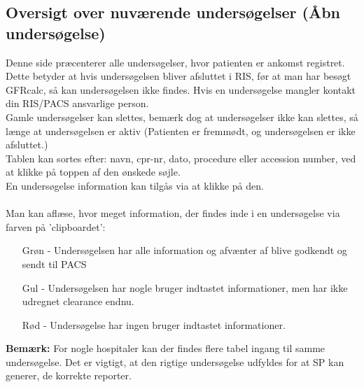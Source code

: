 \documentclass{article}
\begin{document}
\subsection{Oversigt over nuværende undersøgelser (Åbn undersøgelse)}
Denne side præcenterer alle undersøgelser, hvor patienten er ankomst registret. Dette betyder at hvis undersøgelsen bliver afsluttet i RIS, før at man har besøgt GFRcalc, så kan undersøgelsen ikke findes. Hvis en undersøgelse mangler kontakt din RIS/PACS ansvarlige person.\\
Gamle undersøgelser kan slettes, bemærk dog at undersøgelser ikke kan slettes, så længe at undersøgelsen er aktiv (Patienten er fremmødt, og undersøgelsen er ikke afsluttet.)\\
Tablen kan sortes efter: navn, cpr-nr, dato, procedure eller accession number, ved at klikke på toppen af den ønskede søjle.\\
En undersøgelse information kan tilgås via at klikke på den.\\\\
Man kan aflæse, hvor meget information, der findes inde i en undersøgelse via farven på 'clipboardet':
\begin{itemize}
	\item[Grøn] - Undersøgelsen har alle information og afvænter af blive godkendt og sendt til PACS
	\item[Gul] - Undersøgelsen har nogle bruger indtastet informationer, men har ikke udregnet clearance endnu. 
	\item[Rød] - Undersøgelse har ingen bruger indtastet informationer. 
\end{itemize} 
\textbf{Bemærk:} For nogle hospitaler kan der findes flere tabel ingang til samme undersøgelse. Det er vigtigt, at den rigtige undersøgelse udfyldes for at  SP kan generer, de korrekte reporter.    
\end{document}
